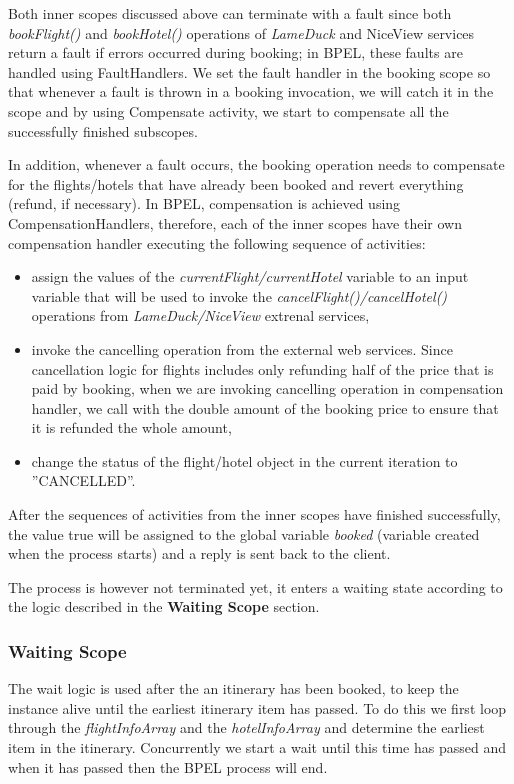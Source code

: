 Both inner scopes discussed above can terminate with a fault since both \textit{bookFlight()} and \textit{bookHotel()} operations of \textit{LameDuck} and NiceView services return a fault if errors occurred during booking; in BPEL, these faults are handled using FaultHandlers. We set the fault handler in the booking scope so that whenever a fault is thrown in a booking invocation, we will catch it in the scope and by using Compensate activity, we start to compensate all the successfully finished subscopes.

In addition, whenever a fault occurs, the booking operation needs to compensate for the flights/hotels that have already been booked and revert everything (refund, if necessary). In BPEL, compensation is achieved using CompensationHandlers, therefore, each of the inner scopes have their own compensation handler executing the following sequence of activities:

\begin{itemize}
\item assign the values of the \textit{currentFlight/currentHotel} variable to an input variable that will be used to invoke the \textit{cancelFlight()/cancelHotel()} operations from \textit{LameDuck/NiceView} extrenal services,
\item invoke the cancelling operation from the external web services. Since cancellation logic for flights includes only refunding half of the price that is paid by booking, when we are invoking cancelling operation in compensation handler, we call with the double amount of the booking price to ensure that it is refunded the whole amount,
\item change the status of the flight/hotel object in the current iteration to ''CANCELLED''.
\end{itemize}

After the sequences of activities from the inner scopes have finished successfully, the value true will be assigned to the global variable \textit{booked} (variable created when the process starts) and a reply is sent back to the client. 

The process is however not terminated yet, it enters a waiting state according to the logic described in the \textbf{Waiting Scope} section.

\subsubsection*{Waiting Scope}

The wait logic is used after the an itinerary has been booked, to keep the instance alive until the earliest itinerary item has passed. To do this we first loop through the \textit{flightInfoArray} and the \textit{hotelInfoArray} and determine the earliest item in the itinerary. Concurrently we start a wait until this time has passed and when it has passed then the BPEL process will end.





